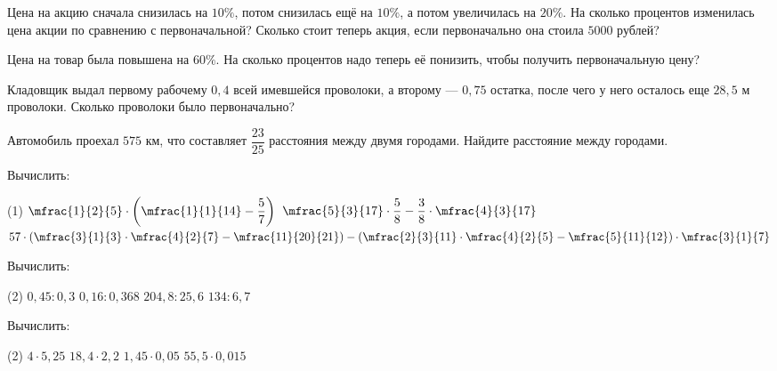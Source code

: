 \begin{exam}
	\begin{listofex}
		\item Цена на акцию сначала снизилась на \(10\%\), потом снизилась ещё на \(10\%\), а потом увеличилась на \(20\%\). На сколько процентов изменилась цена акции по сравнению с первоначальной? Сколько стоит теперь акция, если первоначально она стоила \(5000\) рублей?
		\item Цена на товар была повышена на \( 60\% \). На сколько процентов надо теперь её понизить, чтобы получить первоначальную цену?
		\item Кладовщик выдал первому рабочему \(0,4\) всей имевшейся проволоки, а второму --- \(0,75\) остатка, после чего у него осталось еще \(28,5\) м проволоки. Сколько проволоки было первоначально?
		\item Автомобиль проехал \(575\) км, что составляет \(\dfrac{23}{25}\) расстояния между двумя городами. Найдите расстояние между городами.
		\item Вычислить:
		\begin{tasks}(1)
			\task \( \mfrac{1}{2}{5} \cdot \left( \mfrac{1}{1}{14} - \dfrac{5}{7} \right)  \)
			\task \( \mfrac{5}{3}{17} \cdot \dfrac{5}{8} - \dfrac{3}{8} \cdot \mfrac{4}{3}{17} \)
			\task \( 57 \cdot \left( \mfrac{3}{1}{3} \cdot \mfrac{4}{2}{7} - \mfrac{11}{20}{21} \right) - \left( \mfrac{2}{3}{11} \cdot \mfrac{4}{2}{5} - \mfrac{5}{11}{12} \right) \cdot \mfrac{3}{1}{7} \)
		\end{tasks}
		\item Вычислить:
		\begin{tasks}(2)
			\task \( 0,45: 0,3 \)
			\task \( 0,16:0,368 \)
			\task \( 204,8:25,6 \)
			\task \( 134:6,7 \)
		\end{tasks}
		\item Вычислить:
		\begin{tasks}(2)
			\task \( 4\cdot5,25 \)
			\task \( 18,4\cdot2,2 \)
			\task \( 1,45\cdot0,05 \)
			\task \( 55,5\cdot0,015 \)
		\end{tasks}
	\end{listofex}
\end{exam}
